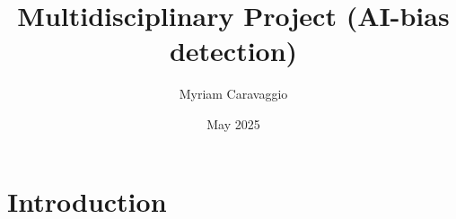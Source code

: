 \documentclass{article}
\title{Multidisciplinary Project (AI-bias detection)}
\author{Myriam Caravaggio}
\date{May 2025}
\begin{document}
\maketitle

\section{Introduction}
\end{document}
